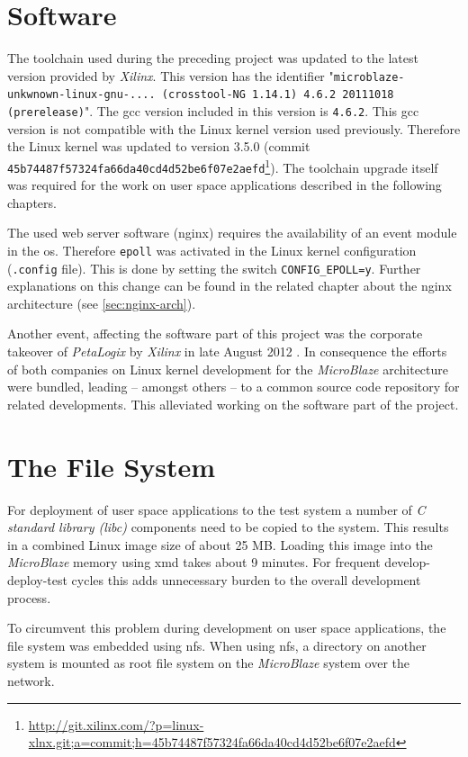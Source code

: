 \section{Software}

The toolchain used during the preceding project was updated to the latest version provided by \textit{Xilinx}. This version has the identifier "\texttt{microblaze-unkwnown-linux-gnu-.... (crosstool-NG 1.14.1) 4.6.2 20111018 (prerelease)}". The \gls{gcc} version included in this version is \texttt{4.6.2}. This \gls{gcc} version is not compatible with the Linux kernel version used previously. Therefore the Linux kernel was updated to version 3.5.0 (commit \texttt{45b74487f57324fa66da40cd4d52be6f07e2aefd}\footnote{\url{http://git.xilinx.com/?p=linux-xlnx.git;a=commit;h=45b74487f57324fa66da40cd4d52be6f07e2aefd}}). The toolchain upgrade itself was required for the work on user space applications described in the following chapters.

The used web server software (nginx) requires the availability of an event module in the \gls{os}. Therefore \texttt{epoll} was activated in the Linux kernel configuration (\texttt{.config} file). This is done by setting the switch \texttt{CONFIG\_EPOLL=y}. Further explanations on this change can be found in the related chapter about the nginx architecture (see \ref{sec:nginx-arch}).

Another event, affecting the software part of this project was the corporate takeover of \textit{PetaLogix} by \textit{Xilinx} in late August 2012 \cite{takeover}. In consequence the efforts of both companies on Linux kernel development for the \textit{MicroBlaze} architecture were bundled, leading -- amongst others -- to a common source code repository for related developments. This alleviated working on the software part of the project.

\section{The File System}

For deployment of user space applications to the test system a number of \textit{C standard library (libc)} components need to be copied to the system. This results in a combined Linux image size of about 25 MB. Loading this image into the \textit{MicroBlaze} memory using \gls{xmd} takes about 9 minutes. For frequent develop-deploy-test cycles this adds unnecessary burden to the overall development process.

To circumvent this problem during development on user space applications, the file system was embedded using \gls{nfs}. When using \gls{nfs}, a directory on another system is mounted as root file system on the \textit{MicroBlaze} system over the network.

